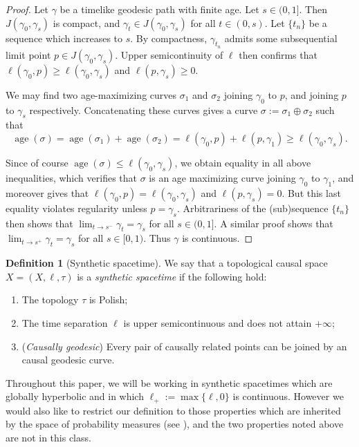 \documentclass{article}
\DeclareMathOperator{\age}{age}
\theoremstyle{definition}
\newtheorem{defn}{Definition}[section]
\begin{document}
\begin{proof}
Let $\gamma$ be a timelike geodesic path with finite age. Let $s\in(0,1]$. Then $J(\gamma_0, \gamma_s)$ is compact, and $\gamma_t\in J(\gamma_0,\gamma_s)$ for all $t\in (0,s)$. Let $\{t_n\}$ be a sequence which increases to $s$. By compactness, $\gamma_{t_n}$ admits some subsequential limit point $p\in J(\gamma_0, \gamma_s)$. Upper semicontinuity of $\ell$ then confirms that $\ell(\gamma_0, p)\geq \ell(\gamma_0, \gamma_s)$ and $\ell(p, \gamma_s)\geq 0$. 

We may find two age-maximizing curves $\sigma_1$ and $\sigma_2$ joining $\gamma_0$ to $p$, and joining $p$ to $\gamma_s$ respectively. Concatenating these curves gives a curve $\sigma:= \sigma_1\oplus \sigma_2$ such that 
\[\age(\sigma)= \age(\sigma_1)+\age(\sigma_2)= \ell(\gamma_0, p)+\ell(p, \gamma_1)\geq \ell(\gamma_0, \gamma_s).\]

Since of course $\age(\sigma)\leq \ell(\gamma_0, \gamma_s)$, we obtain equality in all above inequalities, which verifies that $\sigma$ is an age maximizing curve joining $\gamma_0$ to $\gamma_1$, and moreover gives that $\ell(\gamma_0, p)=\ell(\gamma_0, \gamma_s)$ and $\ell(p, \gamma_s)= 0$. But this last equality violates regularity unless $p=\gamma_s$. Arbitrariness of the (sub)sequence $\{t_n\}$ then shows that $\displaystyle\lim_{t\to s^-} \gamma_t= \gamma_s$ for all $s\in (0,1]$. A similar proof shows that $\displaystyle\lim_{t\to s^+}\gamma_t= \gamma_s$ for all $s\in [0,1)$. Thus $\gamma$ is continuous. 

\end{proof}
 


\begin{defn}[Synthetic spacetime]\label{spacetimedef} We say that a topological causal space $X= (X,\ell,\tau)$ is a {\it synthetic spacetime} if the following hold: 
\begin{enumerate}
\item  The topology $\tau$ is Polish;
\item The time separation $\ell$ is upper semicontinuous and does not attain $+\infty$;
\item ({\it Causally geodesic}) Every pair of causally related points can be joined by an causal geodesic curve.
\end{enumerate}
\end{defn}

Throughout this paper, we will be working in synthetic spacetimes which are globally hyperbolic and in which $\ell_+:= \max\{\ell, 0\}$ is continuous. However we would also like to restrict our definition to those properties which are inherited by the space of probability measures (see ), and the two properties noted above are not in this class.  
\end{document}
